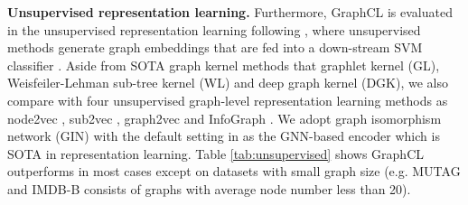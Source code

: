 \textbf{Unsupervised representation learning.}
Furthermore, GraphCL is evaluated in the unsupervised representation learning following \cite{narayanan2017graph2vec,sun2019infograph}, where unsupervised methods generate graph embeddings that are fed into a down-stream SVM classifier \cite{sun2019infograph}. 
Aside from SOTA graph kernel methods that graphlet kernel (GL), Weisfeiler-Lehman sub-tree kernel (WL) and deep graph kernel (DGK), we also compare with four unsupervised graph-level representation learning methods as node2vec \cite{grover2016node2vec}, sub2vec \cite{adhikari2018sub2vec}, graph2vec \cite{narayanan2017graph2vec} and InfoGraph \cite{sun2019infograph}.
We adopt graph isomorphism network (GIN) with the default setting in \cite{sun2019infograph} as the GNN-based encoder which is SOTA in representation learning.
Table \ref{tab:unsupervised} shows GraphCL outperforms in most cases except on datasets with small graph size (e.g. MUTAG and IMDB-B consists of graphs with average node number less than 20).

